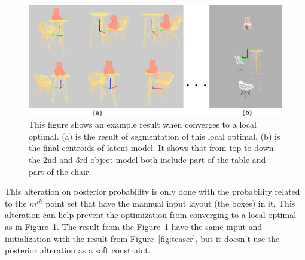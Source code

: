 \begin{figure}[htb]
	\centering
	\includegraphics[width=\linewidth]{images/localoptimal/localoptimal}
	\caption{\label{fig:localoptimal}This figure shows an example result when converges to a local optimal. (a) is the result of segmentation of this local optimal. (b) is the final centroids of latent model. It shows that from top to down the 2nd and 3rd object model both include part of the table and part of the chair.}
\end{figure}
This alteration on posterior probability is only done with the probability related to the $m^{th}$ point set that have the mannual input layout (the boxes) in it. This alteration can help prevent the optimization from converging to a local optimal as in Figure~\ref{fig:localoptimal}. The result from the Figure~\ref{fig:localoptimal} have  the same input and initialization with the result from Figure~\ref{fig:teaser}, but it doesn't  use the posterior alteration as a soft constraint.

